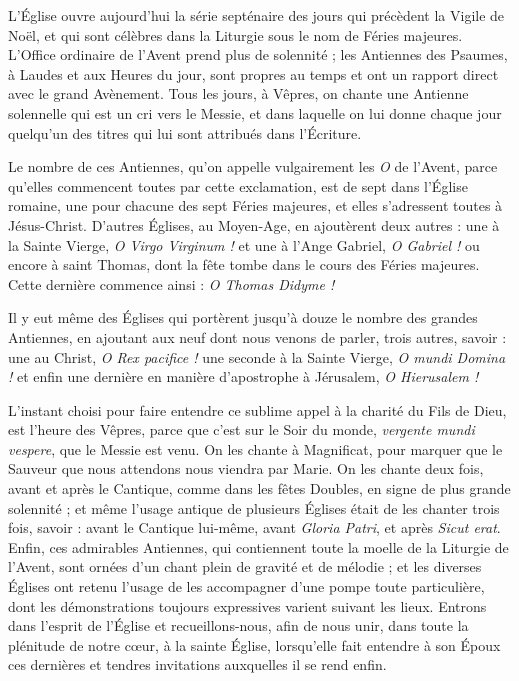 \documentclass[%
fontsize=10%
,a6paper%
,DIV=13%
]{scrartcl}
\title{\centrer{Grandes Antiennes de l'Avent}}
\author{ou Antiennes O}
\date{du 17 au 23 décembre}
\begin{document}
\newcommand{\ligne}[2]{
\begin{center}
\greseparator{#1}{#2}
\end{center}
}

L’Église ouvre aujourd’hui la série septénaire des jours qui précèdent la Vigile de Noël, et qui sont célèbres dans la Liturgie sous le nom de Féries majeures. L’Office ordinaire de l’Avent prend plus de solennité ; les Antiennes des Psaumes, à Laudes et aux Heures du jour, sont propres au temps et ont un rapport direct avec le grand Avènement. Tous les jours, à Vêpres, on chante une Antienne solennelle qui est un cri vers le Messie, et dans laquelle on lui donne chaque jour quelqu’un des titres qui lui sont attribués dans l’Écriture.

Le nombre de ces Antiennes, qu’on appelle vulgairement les \emph{O} de l’Avent, parce qu’elles commencent toutes par cette exclamation, est de sept dans l’Église romaine, une pour chacune des sept Féries majeures, et elles s’adressent toutes à Jésus-Christ. D’autres Églises, au Moyen-Age, en ajoutèrent deux autres : une à la Sainte Vierge, \emph{O Virgo Virginum !} et une à l’Ange Gabriel, \emph{O Gabriel !} ou encore à saint Thomas, dont la fête tombe dans le cours des Féries majeures. Cette dernière commence ainsi : \emph{O Thomas Didyme !}

Il y eut même des Églises qui portèrent jusqu’à douze le nombre des grandes Antiennes, en ajoutant aux neuf dont nous venons de parler, trois autres, savoir : une au Christ, \emph{O Rex pacifice !} une seconde à la Sainte Vierge, \emph{O mundi Domina !} et enfin une dernière en manière d’apostrophe à Jérusalem, \emph{O Hierusalem !}

L’instant choisi pour faire entendre ce sublime appel à la charité du Fils de Dieu, est l’heure des Vêpres, parce que c’est sur le Soir du monde, \emph{vergente mundi vespere}, que le Messie est venu. On les chante à Magnificat, pour marquer que le Sauveur que nous attendons nous viendra par Marie. On les chante deux fois, avant et après le Cantique, comme dans les fêtes Doubles, en signe de plus grande solennité ; et même l’usage antique de plusieurs Églises était de les chanter trois fois, savoir : avant le Cantique lui-même, avant \emph{Gloria Patri}, et après \emph{Sicut erat}. Enfin, ces admirables Antiennes, qui contiennent toute la moelle de la Liturgie de l’Avent, sont ornées d’un chant plein de gravité et de mélodie ; et les diverses Églises ont retenu l’usage de les accompagner d’une pompe toute particulière, dont les démonstrations toujours expressives varient suivant les lieux. Entrons dans l’esprit de l’Église et recueillons-nous, afin de nous unir, dans toute la plénitude de notre cœur, à la sainte Église, lorsqu’elle fait entendre à son Époux ces dernières et tendres invitations auxquelles il se rend enfin.
\end{document}
